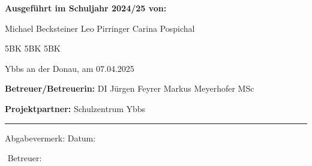 \begin{titlepage}
\begin{center}
		
		\begin{minipage}[t]{0.92\textwidth}
			\begingroup
			\parfillskip=0pt
			\begin{minipage}[t]{0.46\textwidth}
				\textbf{Ausgeführt im Schuljahr 2024/25 von:} 
				\begin{minipage}[t]{0.50\textwidth}
					Michael Becksteiner \newline
					Leo Pirringer \newline
					Carina Pospichal \newline
				\end{minipage}
				\begin{minipage}[t]{0.11\textwidth}
					5BK \newline
					5BK \newline
					5BK \newline
				\end{minipage}
				\newline \newline
				Ybbs an der Donau, am 07.04.2025
			\end{minipage}
			\hfill\vline\hfill
			\begin{minipage}[t]{0.46\textwidth}
				\textbf{Betreuer/Betreuerin:} 
				\newline
				DI Jürgen Feyrer \newline
				Markus Meyerhofer MSc \newline
			
				\textbf{Projektpartner:} Schulzentrum Ybbs
			\end{minipage}
			\par\endgroup
			\vspace{1cm}
		\end{minipage}
		
		\hrule
		\vspace{7mm}
		
		\begin{minipage}[t]{0.92\textwidth}
			\begingroup
			\parfillskip=0pt
			\begin{minipage}[t]{0.46\textwidth}
				Abgabevermerk:
				\newline
				\newline
				Datum:
			\end{minipage}%
			\hfill
			\begin{minipage}[t]{0.46\textwidth}
				$ $
				\newline
				\newline
				Betreuer:
			\end{minipage}%
			\par\endgroup
		\end{minipage}
		
	\end{center}
\end{titlepage}
